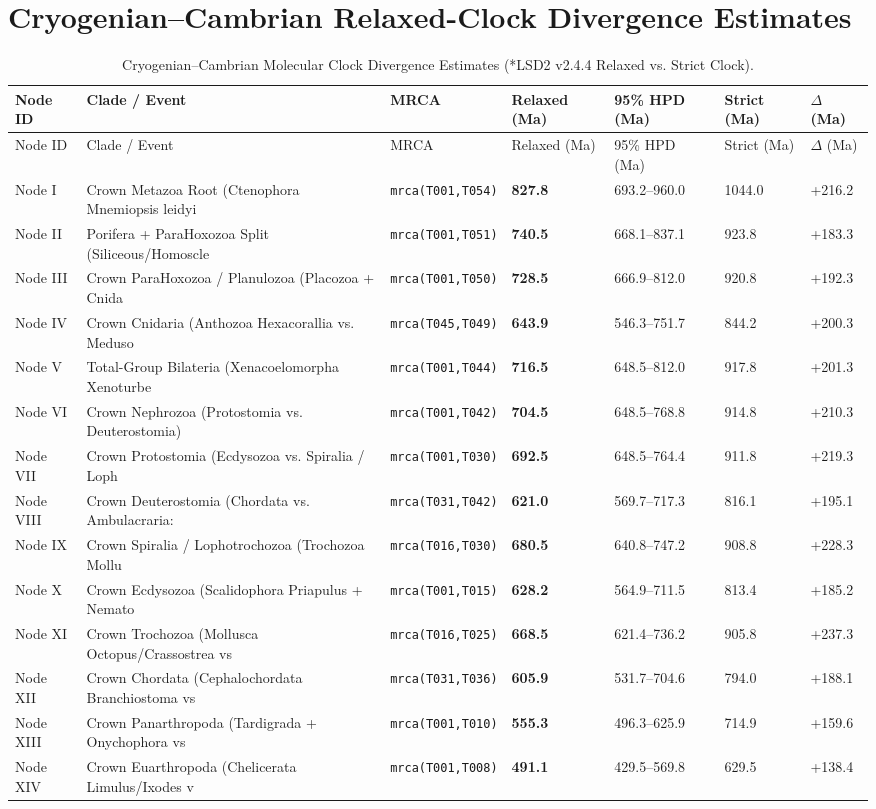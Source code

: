 \documentclass[10pt,letterpaper]{article}
\begin{document}
\section{Cryogenian--Cambrian Relaxed-Clock Divergence Estimates}
\begin{longtable}{lllllll}
\caption{Cryogenian--Cambrian Molecular Clock Divergence Estimates (*LSD2 v2.4.4 Relaxed vs. Strict Clock).} \\
\toprule
Node ID & Clade / Event & MRCA & Relaxed (Ma) & 95\% HPD (Ma) & Strict (Ma) & $\Delta$ (Ma) \\
\midrule
\endfirsthead
\toprule
Node ID & Clade / Event & MRCA & Relaxed (Ma) & 95\% HPD (Ma) & Strict (Ma) & $\Delta$ (Ma) \\
\midrule
\endhead
Node I & Crown Metazoa Root (Ctenophora Mnemiopsis leidyi & \texttt{mrca(T001,T054)} & \textbf{827.8} & 693.2--960.0 & 1044.0 & +216.2 \\
Node II & Porifera + ParaHoxozoa Split (Siliceous/Homoscle & \texttt{mrca(T001,T051)} & \textbf{740.5} & 668.1--837.1 & 923.8 & +183.3 \\
Node III & Crown ParaHoxozoa / Planulozoa (Placozoa + Cnida & \texttt{mrca(T001,T050)} & \textbf{728.5} & 666.9--812.0 & 920.8 & +192.3 \\
Node IV & Crown Cnidaria (Anthozoa Hexacorallia vs. Meduso & \texttt{mrca(T045,T049)} & \textbf{643.9} & 546.3--751.7 & 844.2 & +200.3 \\
Node V & Total-Group Bilateria (Xenacoelomorpha Xenoturbe & \texttt{mrca(T001,T044)} & \textbf{716.5} & 648.5--812.0 & 917.8 & +201.3 \\
Node VI & Crown Nephrozoa (Protostomia vs. Deuterostomia) & \texttt{mrca(T001,T042)} & \textbf{704.5} & 648.5--768.8 & 914.8 & +210.3 \\
Node VII & Crown Protostomia (Ecdysozoa vs. Spiralia / Loph & \texttt{mrca(T001,T030)} & \textbf{692.5} & 648.5--764.4 & 911.8 & +219.3 \\
Node VIII & Crown Deuterostomia (Chordata vs. Ambulacraria:  & \texttt{mrca(T031,T042)} & \textbf{621.0} & 569.7--717.3 & 816.1 & +195.1 \\
Node IX & Crown Spiralia / Lophotrochozoa (Trochozoa Mollu & \texttt{mrca(T016,T030)} & \textbf{680.5} & 640.8--747.2 & 908.8 & +228.3 \\
Node X & Crown Ecdysozoa (Scalidophora Priapulus + Nemato & \texttt{mrca(T001,T015)} & \textbf{628.2} & 564.9--711.5 & 813.4 & +185.2 \\
Node XI & Crown Trochozoa (Mollusca Octopus/Crassostrea vs & \texttt{mrca(T016,T025)} & \textbf{668.5} & 621.4--736.2 & 905.8 & +237.3 \\
Node XII & Crown Chordata (Cephalochordata Branchiostoma vs & \texttt{mrca(T031,T036)} & \textbf{605.9} & 531.7--704.6 & 794.0 & +188.1 \\
Node XIII & Crown Panarthropoda (Tardigrada + Onychophora vs & \texttt{mrca(T001,T010)} & \textbf{555.3} & 496.3--625.9 & 714.9 & +159.6 \\
Node XIV & Crown Euarthropoda (Chelicerata Limulus/Ixodes v & \texttt{mrca(T001,T008)} & \textbf{491.1} & 429.5--569.8 & 629.5 & +138.4 \\
\bottomrule
\end{longtable}
\end{document}
